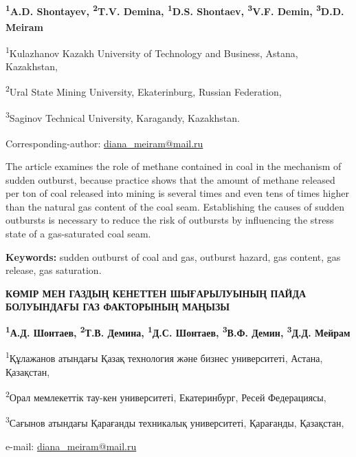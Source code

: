 
\begin{articleheader}

{\bfseries
\textsuperscript{1}A.D. Shontayev,
\textsuperscript{2}T.V. Demina,
\textsuperscript{1}D.S. Shontaev,
\textsuperscript{3}V.F. Demin,
\textsuperscript{3}D.D. Meiram\textsuperscript{\envelope}
}
\end{articleheader}

\begin{affiliation}
\textsuperscript{1}Kulazhanov Kazakh University of Technology and Business, Astana, Kazakhstan,

\textsuperscript{2}Ural State Mining University, Ekaterinburg, Russian Federation,

\textsuperscript{3}Saginov Technical University, Karagandy, Kazakhstan.

\raggedright \textsuperscript{\envelope }Corresponding-author: \href{mailto:baiz76@mail.ru}{diana\_meiram@mail.ru}
\end{affiliation}

The article examines the role of methane contained in coal in the
mechanism of sudden outburst, because practice shows that the amount of
methane released per ton of coal released into mining is several times
and even tens of times higher than the natural gas content of the coal
seam. Establishing the causes of sudden outbursts is necessary to reduce
the risk of outbursts by influencing the stress state of a gas-saturated
coal seam.

{\bfseries Keywords:} sudden outburst of coal and gas, outburst hazard, gas
content, gas release, gas saturation.

\begin{articleheader}
{\bfseries КӨМІР МЕН ГАЗДЫҢ КЕНЕТТЕН ШЫҒАРЫЛУЫНЫҢ ПАЙДА БОЛУЫНДАҒЫ ГАЗ ФАКТОРЫНЫҢ МАҢЫЗЫ}

{\bfseries
\textsuperscript{1}А.Д. Шонтаев,
\textsuperscript{2}Т.В. Демина,
\textsuperscript{1}Д.С. Шонтаев,
\textsuperscript{3}В.Ф. Демин,
\textsuperscript{3}Д.Д. Мейрам\textsuperscript{\envelope }
}
\end{articleheader}

\begin{affiliation}
\textsuperscript{1}Құлажанов атындағы Қазақ технология және бизнес университеті, Астана, Қазақстан,

\textsuperscript{2}Орал мемлекеттік тау-кен университеті, Екатеринбург, Ресей Федерациясы,

\textsuperscript{3}Сағынов атындағы Қарағанды техникалық университеті, Қарағанды, Қазақстан,

e-mail: \href{mailto:baiz76@mail.ru}{diana\_meiram@mail.ru}
\end{affiliation}

